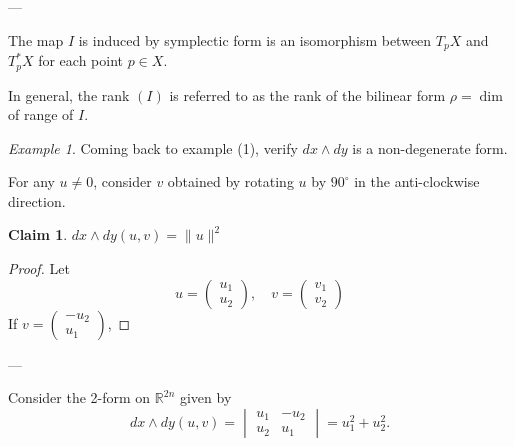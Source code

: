 \documentclass[11pt]{article}
\theoremstyle{definition}
\newtheorem{claim}{Claim}
\theoremstyle{remark}
\newtheorem{example}{Example}[section]
\begin{document}
---

The map $I$ is induced by symplectic form is an isomorphism between $T_p X$ and $T_p^* X$ for each point $p \in X$.

In general, the rank $(I)$ is referred to as the rank of the bilinear form $\rho = \dim$ of range of $I$.

\begin{example}\label{ex:non_degenerate_form}
Coming back to example (1), verify $dx \wedge dy$ is a non-degenerate form.

For any $u \neq 0$, consider $v$ obtained by rotating $u$ by $90^\circ$ in the anti-clockwise direction.

\begin{claim}
$dx \wedge dy(u,v) = \|u\|^2$
\end{claim}

\begin{proof}
Let
\[
u = \begin{pmatrix} u_1 \\ u_2 \end{pmatrix}, \quad v = \begin{pmatrix} v_1 \\ v_2 \end{pmatrix}
\]
If $v = \begin{pmatrix} -u_2 \\ u_1 \end{pmatrix}$,
\end{proof}
\end{example}

---

Consider the 2-form on $\mathbb{R}^{2n}$ given by
\[
dx \wedge dy(u,v) = \begin{vmatrix}
u_1 & -u_2 \\
u_2 & u_1
\end{vmatrix} = u_1^2 + u_2^2.
\]
\end{document}
